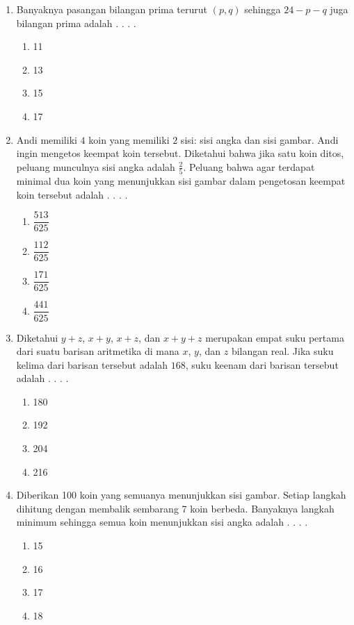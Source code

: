 \documentclass[12pt]{scrartcl}
\begin{document}
\begin{enumerate}
    \item Banyaknya pasangan bilangan prima terurut $(p,q)$ sehingga $24-p-q$ juga bilangan prima adalah . . . .
    \begin{enumerate}[label={(\Alph*)}]
        \item 11 \item 13 \item 15 \item 17
    \end{enumerate}

    \item Andi memiliki $4$ koin yang memiliki $2$ sisi: sisi angka dan sisi gambar. Andi ingin mengetos keempat koin tersebut. Diketahui bahwa jika satu koin ditos, peluang munculnya sisi angka adalah $\frac{2}{5}$. Peluang bahwa agar terdapat minimal dua koin yang menunjukkan sisi gambar dalam pengetosan keempat koin tersebut adalah . . . .
    \begin{enumerate}[label={(\Alph*)}]
        \item $\dfrac{513}{625}$ \item $\dfrac{112}{625}$ \item $\dfrac{171}{625}$ \item $\dfrac{441}{625}$
    \end{enumerate}

    \item Diketahui $y+z$, $x+y$, $x+z$, dan $x+y+z$ merupakan empat suku pertama dari suatu barisan aritmetika di mana $x$, $y$, dan $z$ bilangan real. Jika suku kelima dari barisan tersebut adalah $168$, suku keenam dari barisan tersebut adalah . . . .
    \begin{enumerate}[label={(\Alph*)}]
        \item 180 \item 192 \item 204 \item 216
    \end{enumerate}

    \item Diberikan 100 koin yang semuanya menunjukkan sisi gambar. Setiap langkah dihitung dengan membalik sembarang 7 koin berbeda. Banyaknya langkah minimum sehingga semua koin menunjukkan sisi angka adalah . . . .
    \begin{enumerate}[label={(\Alph*)}]
        \item 15 \item 16 \item 17 \item 18
    \end{enumerate}


\end{enumerate}
\end{document}
